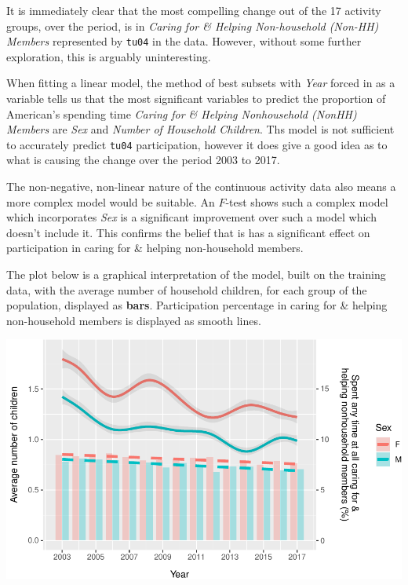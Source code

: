 \documentclass[11pt,]{article}
\begin{document}
It is immediately clear that the most compelling change out of the 17
activity groups, over the period, is in \emph{Caring for \& Helping
Non-household (Non-HH) Members} represented by \texttt{tu04} in the
data. However, without some further exploration, this is arguably
uninteresting.

When fitting a linear model, the method of best subsets with \emph{Year}
forced in as a variable tells us that the most significant variables to
predict the proportion of American's spending time \emph{Caring for \&
Helping Nonhousehold (NonHH) Members} are \emph{Sex} and \emph{Number of
Household Children}. Ths model is not sufficient to accurately predict
\texttt{tu04} participation, however it does give a good idea as to what
is causing the change over the period 2003 to 2017.

The non-negative, non-linear nature of the continuous activity data also
means a more complex model would be suitable. An \(F\)-test shows such a
complex model which incorporates \emph{Sex} is a significant improvement
over such a model which doesn't include it. This confirms the belief
that is has a significant effect on participation in caring for \&
helping non-household members.

The plot below is a graphical interpretation of the model, built on the
training data, with the average number of household children, for each
group of the population, displayed as \textbf{bars}. Participation
percentage in caring for \& helping non-household members is displayed
as smooth lines.

\includegraphics{Final-Report_files/figure-latex/part_tu04 Sex Plot with Number of Children-1.pdf}
\end{document}
